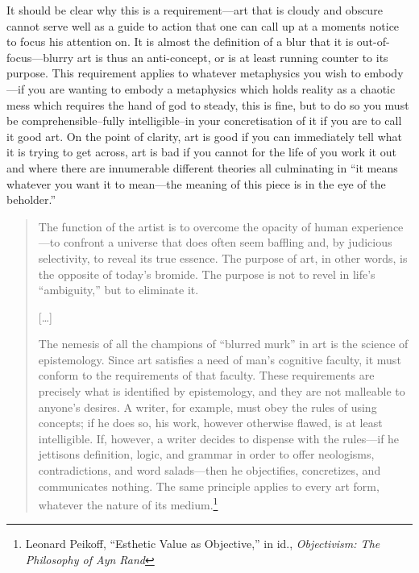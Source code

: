 \documentclass[11pt]{article}
\begin{document}
It should be clear why this is a requirement---art that is cloudy and obscure cannot serve well as a guide to action that one can call up at a moments notice to focus his attention on. It is almost the definition of a blur that it is out-of-focus---blurry art is thus an anti-concept, or is at least running counter to its purpose. This requirement applies to whatever metaphysics you wish to embody---if you are wanting to embody a metaphysics which holds reality as a chaotic mess which requires the hand of god to steady, this is fine, but to do so you must be comprehensible--fully intelligible--in your concretisation of it if you are to call it good art. On the point of clarity, art is good if you can immediately tell what it is trying to get across, art is bad if you cannot for the life of you work it out and where there are innumerable different theories all culminating in ``it means whatever you want it to mean---the meaning of this piece is in the eye of the beholder.''

\begin{quote}
The function of the artist is to overcome the opacity of human experience---to confront a universe that does often seem baffling and, by judicious selectivity, to reveal its true essence. The purpose of art, in other words, is the opposite of today's bromide. The purpose is not to revel in life's ``ambiguity,'' but to eliminate it.

[\ldots{}]

The nemesis of all the champions of ``blurred murk'' in art is the science of epistemology. Since art satisfies a need of man's cognitive faculty, it must conform to the requirements of that faculty. These requirements are precisely what is identified by epistemology, and they are not malleable to anyone's desires. A writer, for example, must obey the rules of using concepts; if he does so, his work, however otherwise flawed, is at least intelligible. If, however, a writer decides to dispense with the rules—if he jettisons definition, logic, and grammar in order to offer neologisms, contradictions, and word salads—then he objectifies, concretizes, and communicates nothing. The same principle applies to every art form, whatever the nature of its medium.\footnote{Leonard Peikoff, ``Esthetic Value as Objective,'' in id., \emph{Objectivism: The Philosophy of Ayn Rand}}
\end{quote}
\end{document}
